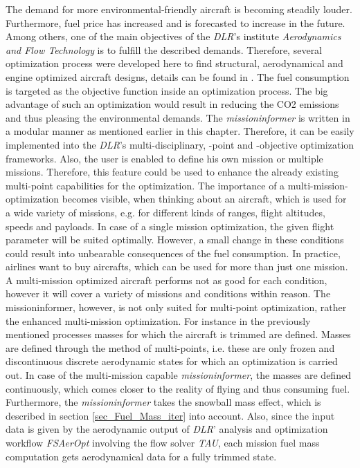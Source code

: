 The demand for more environmental-friendly 
aircraft is 
becoming steadily louder. Furthermore, fuel price 
has increased and is 
forecasted to increase in the future. Among others, one 
of the main objectives of
the \emph{DLR}'s institute 
\emph{Aerodynamics and Flow Technology} is to fulfill the described demands. 
Therefore, several 
optimization process were developed here
to find  structural, aerodynamical and 
engine optimized aircraft designs, 
details can be found in \cite{gortz_collaborative_2016, goertz_overview_2020}. 
The fuel consumption 
is targeted as the objective function inside an optimization process. The big 
advantage of such an optimization would result in reducing the CO2 emissions and 
thus pleasing the environmental demands. The \emph{missioninformer} is 
written in a modular manner as mentioned earlier in this chapter.
Therefore, it can be easily implemented into the \emph{DLR}'s 
multi-disciplinary, -point and -objective optimization frameworks. 
Also, the user is enabled to define his own mission or multiple missions. 
Therefore, this feature could be used to enhance the already existing 
multi-point capabilities for the optimization. The importance 
of a multi-mission-optimization becomes visible, when thinking about 
an aircraft, which is used for a wide variety of missions, e.g. 
for different kinds of ranges, flight altitudes, speeds and payloads. 
In case of a single mission optimization, the given 
flight parameter will be suited optimally. However, a small 
change in these conditions could result into unbearable consequences of
the fuel consumption. 
In practice, airlines want to buy aircrafts, which can be used 
for more than just one mission. A multi-mission optimized 
aircraft performs not as good for each condition, however it 
will cover a variety of missions and conditions within reason. The 
missioninformer, however, is not only suited for multi-point 
optimization, rather the enhanced multi-mission optimization.
For instance in the previously mentioned processes masses for which 
the aircraft is trimmed are defined.
Masses are defined through the method of multi-points, i.e.
these are 
only frozen and discontinuous discrete aerodynamic states for which 
an optimization is carried out. In case of the multi-mission
capable \emph{missioninformer}, 
the masses are defined continuously, which comes closer 
to the reality of flying and thus consuming 
fuel. Furthermore, the \emph{missioninformer} takes 
the snowball mass effect, which is described in 
section \ref{sec_Fuel_Mass_iter} into account. Also, 
since the input data is given by the aerodynamic output 
of \emph{DLR}' analysis and 
optimization workflow \emph{FSAerOpt} 
\cite{merle_high-fidelity_2019} involving the 
flow solver \emph{TAU}, each mission fuel mass 
computation gets 
aerodynamical data for a fully trimmed 
state.
\newline


